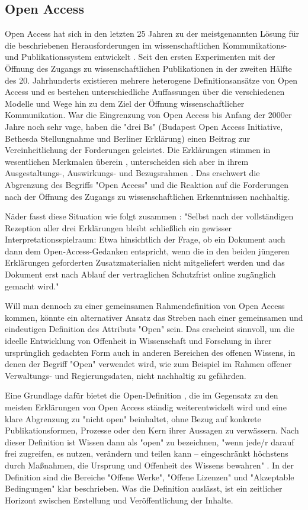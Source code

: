 \subsection{Open Access}

Open Access hat sich in den letzten 25 Jahren zu der meistgenannten Lösung für die beschriebenen Herausforderungen im wissenschaftlichen Kommunikations- und Publikationssystem entwickelt \cite{Brembs_2015}. Seit den ersten Experimenten mit der Öffnung des Zugangs zu wissenschaftlichen Publikationen in der zweiten Hälfte des 20. Jahrhunderts existieren mehrere heterogene Definitionsansätze von Open Access und es bestehen unterschiedliche Auffassungen über die verschiedenen Modelle und Wege hin zu dem Ziel der Öffnung wissenschaftlicher Kommunikation. War die Eingrenzung von Open Access bis Anfang der 2000er Jahre noch sehr vage, haben die "drei Bs" (Budapest Open Access Initiative, Bethesda Stellungnahme und Berliner Erklärung) einen Beitrag zur Vereinheitlichung der Forderungen geleistet. Die Erklärungen stimmen in wesentlichen Merkmalen überein \cite{Albert_2006}, unterscheiden sich aber in ihrem Ausgestaltungs-, Auswirkungs- und Bezugsrahmen \cite{Naeder_2010}. Das erschwert die Abgrenzung des Begriffs "Open Access" und die Reaktion auf die Forderungen nach der Öffnung des Zugangs zu wissenschaftlichen Erkenntnissen nachhaltig.

Näder fasst diese Situation wie folgt zusammen \cite{Naeder_2010}:
"Selbst nach der vollständigen Rezeption aller drei Erklärungen bleibt schließlich ein gewisser Interpretationsspielraum: Etwa hinsichtlich der Frage, ob ein Dokument auch dann dem Open-Access-Gedanken entspricht, wenn die in den beiden jüngeren Erklärungen geforderten Zusatzmaterialien nicht mitgeliefert werden und das Dokument erst nach Ablauf der vertraglichen Schutzfrist online zugänglich gemacht wird."

Will man dennoch zu einer gemeinsamen Rahmendefinition von Open Access kommen, könnte ein alternativer Ansatz das Streben nach einer gemeinsamen und eindeutigen Definition des Attributs "Open" sein. Das erscheint sinnvoll, um die ideelle Entwicklung von Offenheit in Wissenschaft und Forschung in ihrer ursprünglich gedachten Form auch in anderen Bereichen des offenen Wissens, in denen der Begriff "Open" verwendet wird, wie zum Beispiel im Rahmen offener Verwaltungs- und Regierungsdaten, nicht nachhaltig zu gefährden.

Eine Grundlage dafür bietet die Open-Definition \cite{Open_Definition_2014}, die im Gegensatz zu den meisten Erklärungen von Open Access ständig weiterentwickelt wird und eine klare Abgrenzung zu "nicht open" beinhaltet, ohne Bezug auf konkrete Publikationsformen, Prozesse oder den Kern ihrer Aussagen zu verwässern. Nach dieser Definition ist Wissen dann als "open" zu bezeichnen, "wenn jede/r darauf frei zugreifen, es nutzen, verändern und teilen kann – eingeschränkt höchstens durch Maßnahmen, die Ursprung und Offenheit des Wissens bewahren" \cite{Open_Definition_2014}. In der Definition sind die Bereiche "Offene Werke", "Offene Lizenzen" und "Akzeptable Bedingungen" klar beschrieben. Was die Definition auslässt, ist ein zeitlicher Horizont zwischen Erstellung und Veröffentlichung der Inhalte.

